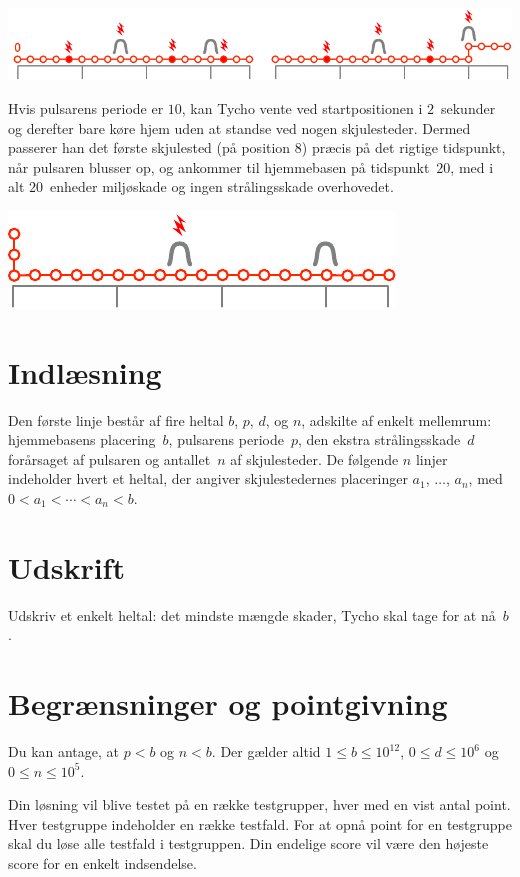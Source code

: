 \includegraphics[width=.8\textwidth]{img/sample1_2.pdf}

Hvis pulsarens periode er $10$, kan Tycho vente ved startpositionen i $2$~sekunder og derefter bare køre hjem uden at standse ved nogen skjulesteder.
Dermed passerer han det første skjulested (på position $8$) præcis på det rigtige tidspunkt, når pulsaren blusser op, og ankommer til hjemmebasen på tidspunkt~$20$, med i alt $20$~enheder miljøskade og ingen strålingsskade overhovedet.

\includegraphics[width=.4\textwidth]{img/sample3.pdf}

\section*{Indlæsning}

Den første linje består af fire heltal $b$, $p$, $d$, og $n$, adskilte af enkelt mellemrum:
hjemmebasens placering~$b$,
pulsarens periode~$p$,
den ekstra strålingsskade~$d$ forårsaget af pulsaren og
antallet~$n$ af skjulesteder.
De følgende $n$ linjer indeholder hvert et heltal, der angiver skjulestedernes placeringer $a_1$, $\ldots$, $a_n$, med
$0<a_1<\cdots <a_n< b$. %

\section*{Udskrift}

Udskriv et enkelt heltal: det mindste mængde skader, Tycho skal tage for at nå~$b$.

\section*{Begrænsninger og pointgivning}

Du kan antage, at
$p < b$ %
og
$n < b$. %
Der gælder altid
$1\leq b\leq 10^{12}$, %
$0\leq d \leq 10^6$ %
og
$0\leq n \leq 10^5$. %

Din løsning vil blive testet på en række testgrupper, hver med en vist antal point.
Hver testgruppe indeholder en række testfald.
For at opnå point for en testgruppe skal du løse alle testfald i testgruppen.
Din endelige score vil være den højeste score for en enkelt indsendelse.

